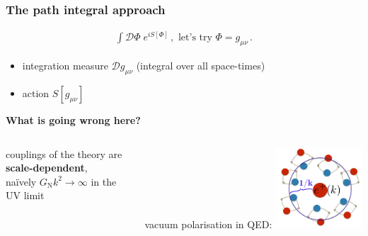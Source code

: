 \documentclass[]{beamer}  %
\newcommand\GNewton{ G_{\scriptscriptstyle{\mathrm{N}}}{} }
\newcommand\metric{ g_{\mu\nu} }
\begin{document}
\addtocounter{framenumber}{-1}
\begin{frame}
  \frametitle{The path integral approach}
  \begin{align*}
    \boxed{
    \int \mathcal D \Phi \; e^{i S[\Phi]}\,,
    \text{ let's try } \Phi = \metric \,.
    }
  \end{align*}
  \vfill
  \begin{itemize}
    \item integration measure $\mathcal D \metric$ (integral over all space-times)
    \item action $S[\metric]$
  \end{itemize}
  \vfill
  \begin{center}
    \fontsize{12pt}{7.2}\selectfont
    \textbf{ What is going wrong here? }
  \end{center}
  \begin{columns}[T]
    \begin{column}{.5\textwidth}
      \begin{center}
        couplings of the theory are \textbf{scale-dependent},\\[10pt]
        na\"ively $\GNewton k^2 \rightarrow \infty$ in the UV limit
      \end{center}
    \end{column}
    \begin{column}{.5\textwidth}
      \begin{center}
        vacuum polarisation in QED:
        \includegraphics[width=0.4\textwidth]{screening.png}
      \end{center}
    \end{column}
  \end{columns}
\end{frame}


\end{document}
